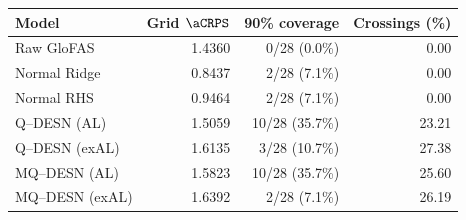 \begin{tabular}{lrrr}
\toprule
Model & Grid $\aCRPS$ & 90\% coverage & Crossings (\%) \\
\midrule
Raw GloFAS & 1.4360 & 0/28 (0.0\%) & 0.00 \\
Normal Ridge & 0.8437 & 2/28 (7.1\%) & 0.00 \\
Normal RHS & 0.9464 & 2/28 (7.1\%) & 0.00 \\
Q--DESN (AL) & 1.5059 & 10/28 (35.7\%) & 23.21 \\
Q--DESN (exAL) & 1.6135 & 3/28 (10.7\%) & 27.38 \\
MQ--DESN (AL) & 1.5823 & 10/28 (35.7\%) & 25.60 \\
MQ--DESN (exAL) & 1.6392 & 2/28 (7.1\%) & 26.19 \\
\bottomrule
\end{tabular}
